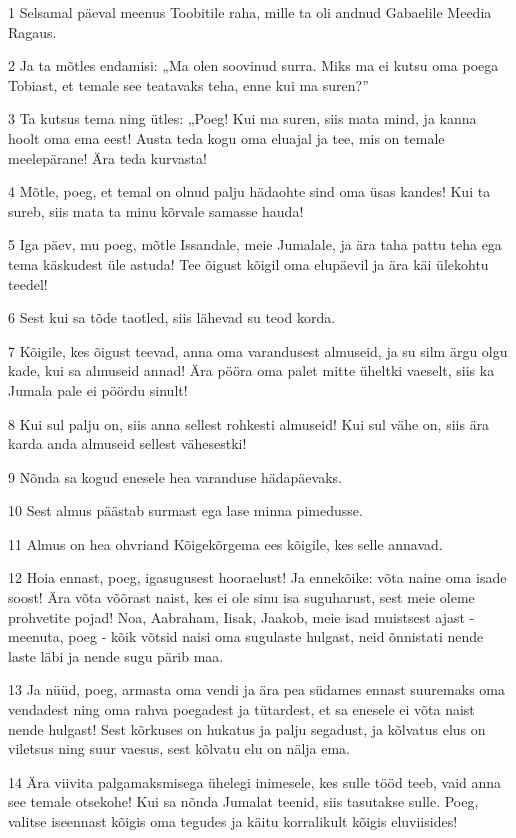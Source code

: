 \par 1 Selsamal päeval meenus Toobitile raha, mille ta oli andnud  Gabaelile Meedia Ragaus.
\par 2 Ja ta mõtles endamisi: „Ma olen soovinud surra. Miks ma ei kutsu  oma poega Tobiast, et temale see teatavaks teha, enne kui ma suren?”
\par 3 Ta kutsus tema ning ütles: „Poeg! Kui ma suren, siis mata mind, ja  kanna hoolt oma ema eest! Austa teda kogu oma eluajal ja tee, mis on  temale meelepärane! Ära teda kurvasta!
\par 4 Mõtle, poeg, et temal on olnud palju hädaohte sind oma üsas  kandes! Kui ta sureb, siis mata ta minu kõrvale samasse  hauda!
\par 5 Iga päev, mu poeg, mõtle Issandale, meie Jumalale, ja ära taha  pattu teha ega tema käskudest üle astuda! Tee õigust kõigil oma  elupäevil ja ära käi ülekohtu teedel!
\par 6 Sest kui sa tõde taotled, siis lähevad su teod korda.
\par 7 Kõigile, kes õigust teevad, anna oma varandusest almuseid, ja su  silm ärgu olgu kade, kui sa almuseid annad! Ära pööra oma palet mitte  üheltki vaeselt, siis ka Jumala pale ei pöördu sinult!
\par 8 Kui sul palju on, siis anna sellest rohkesti almuseid! Kui sul  vähe on, siis ära karda anda almuseid sellest vähesestki!
\par 9 Nõnda sa kogud enesele hea varanduse hädapäevaks.
\par 10 Sest almus päästab surmast ega lase minna pimedusse.
\par 11 Almus on hea ohvriand Kõigekõrgema ees kõigile, kes selle  annavad.
\par 12 Hoia ennast, poeg, igasugusest hooraelust! Ja ennekõike: võta  naine oma isade soost! Ära võta võõrast naist, kes ei ole sinu isa  suguharust, sest meie oleme prohvetite pojad! Noa, Aabraham, Iisak,  Jaakob, meie isad muistsest ajast - meenuta, poeg - kõik võtsid naisi  oma sugulaste hulgast, neid õnnistati nende laste läbi ja nende sugu  pärib maa.
\par 13 Ja nüüd, poeg, armasta oma vendi ja ära pea südames ennast  suuremaks oma vendadest ning oma rahva poegadest ja tütardest, et sa  enesele ei võta naist nende hulgast! Sest kõrkuses on hukatus ja palju  segadust, ja kõlvatus elus on viletsus ning suur vaesus, sest kõlvatu  elu on nälja ema.
\par 14 Ära viivita palgamaksmisega ühelegi inimesele, kes sulle tööd teeb,  vaid anna see temale otsekohe! Kui sa nõnda Jumalat teenid, siis  tasutakse sulle. Poeg, valitse iseennast kõigis oma tegudes ja käitu  korralikult kõigis eluviisides!
